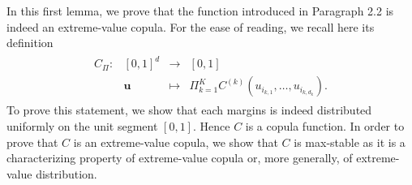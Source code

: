 \documentclass[11pt]{article}
\theoremstyle{definition}
\begin{document}
        In this first lemma, we prove that the function introduced in Paragraph 2.2 is indeed an extreme-value copula. For the ease of reading, we recall here its definition
        \begin{align*}
			\begin{array}{lrcl}
C_{\Pi} : & [0,1]^d & \longrightarrow & [0,1] \\
    & \textbf{u} & \longmapsto & \Pi_{k=1}^K C^{(k)}(u_{i_{k,1}}, \dots, u_{i_{k,d_k}}). \end{array}
		\end{align*}
		To prove this statement, we show that each margins is indeed distributed uniformly on the unit segment $[0,1]$. Hence $C$ is a copula function. In order to prove that $C$ is an extreme-value copula, we show that $C$ is max-stable as it is a characterizing property of extreme-value copula or, more generally, of extreme-value distribution.
\end{document}
